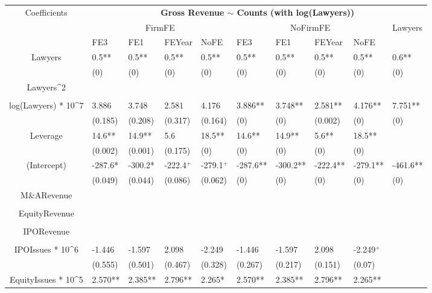 \documentclass{article}
\begin{document}
\begin{table}[H]
\centering
\begin{tabular}{|clllllllll|}
\hline
\multirow{3}{*}{Coefficients} & \multicolumn{9}{c|}{\textbf{Gross Revenue $\sim$ Counts (with log(Lawyers))}} \\
\cline{2-10}
& \multicolumn{4}{c}{FirmFE} & \multicolumn{4}{c}{NoFirmFE} & \multirow{2}{*}{Lawyers} \\
\cline{2-9}
& FE3 & FE1 & FEYear & NoFE & FE3 & FE1 & FEYear & NoFE &  \\
\hline
 
Lawyers & 0.5** & 0.5** & 0.5** & 0.5** & 0.5** & 0.5** & 0.5** & 0.5** & 0.6** \\ 
   & (0) & (0) & (0) & (0) & (0) & (0) & (0) & (0) & (0) \\ 
  Lawyers^2 &  &  &  &  &  &  &  &  &  \\ 
   &  &  &  &  &  &  &  &  &  \\ 
  log(Lawyers) * 10^7 & 3.886 & 3.748 & 2.581 & 4.176 & 3.886** & 3.748** & 2.581** & 4.176** & 7.751** \\ 
   & (0.185) & (0.208) & (0.317) & (0.164) & (0) & (0) & (0.002) & (0) & (0) \\ 
  Leverage & 14.6** & 14.9** & 5.6 & 18.5** & 14.6** & 14.9** & 5.6** & 18.5** &  \\ 
   & (0.002) & (0.001) & (0.175) & (0) & (0) & (0) & (0) & (0) &  \\ 
  (Intercept) & -287.6* & -300.2* & -222.4$^{+}$ & -279.1$^{+}$ & -287.6** & -300.2** & -222.4** & -279.1** & -461.6** \\ 
   & (0.049) & (0.044) & (0.086) & (0.062) & (0) & (0) & (0) & (0) & (0) \\ 
  M\&ARevenue &  &  &  &  &  &  &  &  &  \\ 
   &  &  &  &  &  &  &  &  &  \\ 
  EquityRevenue &  &  &  &  &  &  &  &  &  \\ 
   &  &  &  &  &  &  &  &  &  \\ 
  IPORevenue &  &  &  &  &  &  &  &  &  \\ 
   &  &  &  &  &  &  &  &  &  \\ 
  IPOIssues * 10^6 & -1.446 & -1.597 & 2.098 & -2.249 & -1.446 & -1.597 & 2.098 & -2.249$^{+}$ &  \\ 
   & (0.555) & (0.501) & (0.467) & (0.328) & (0.267) & (0.217) & (0.151) & (0.07) &  \\ 
  EquityIssues * 10^5 & 2.570** & 2.385** & 2.796** & 2.265* & 2.570** & 2.385** & 2.796** & 2.265** &  \\ 

\end{tabular}
\end{table}
\end{document}
